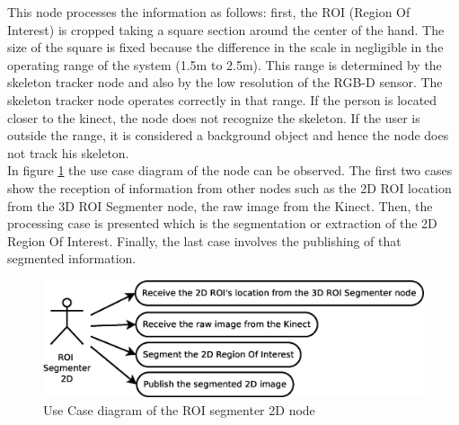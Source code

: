 	This node processes the information as follows: first, the ROI (Region Of Interest) is cropped taking a square section around the center of the hand. 
	The size of the square is fixed because the difference in the scale in negligible in the operating range of the system (1.5m to 2.5m). 
	This range is determined by the skeleton tracker node and also by the low resolution of the RGB-D sensor. 
	The skeleton tracker node operates correctly in that range. 
	If the person is located closer to the kinect, the node does not recognize the skeleton. 
	If the user is outside the range, it is considered a background object and hence the node does not track his skeleton. 
	\\

	In figure \ref{uc_roi2d} the use case diagram of the node can be observed.
	The first two cases show the reception of information from other nodes such as the 2D ROI location from the 3D ROI Segmenter node, the raw image from the Kinect. 
	Then, the processing case is presented which is the segmentation or extraction of the 2D Region Of Interest. 
	Finally, the last case involves the publishing of that segmented information. 
\newpage

	\vspace{0.5cm}


	\begin{figure}[H]
		\centering
			\includegraphics[scale=0.4]{img/diagrams/uc_roi_segmenter_2d.eps}
			\caption[Use case diagram ROI segmenter 2D node]{Use Case diagram of the ROI segmenter 2D node}
		\label{uc_roi2d}
	\end{figure}
\vspace{0.5cm}




